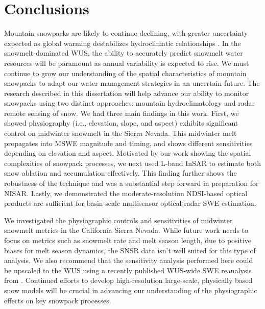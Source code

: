 
\hypertarget{ch5}{\chapter{Conclusions}\label{ch5}}

Mountain snowpacks are likely to continue declining, with greater uncertainty expected as global warming destabilizes hydroclimatic relationships \citep{millyStationarityDeadWhither2008}. In the snowmelt-dominated WUS, the ability to accurately predict snowmelt water resources will be paramount as annual variability is expected to rise. We must continue to grow our understanding of the spatial characteristics of mountain snowpacks to adapt our water management strategies in an uncertain future. The research described in this dissertation will help advance our ability to monitor snowpacks using two distinct approaches: mountain hydroclimatology and radar remote sensing of snow. We had three main findings in this work. First, we showed physiography (i.e., elevation, slope, and aspect) exhibits significant control on midwinter snowmelt in the Sierra Nevada. This midwinter melt propagates into MSWE magnitude and timing, and shows different sensitivities depending on elevation and aspect. Motivated by our work showing the spatial complexities of snowpack processes, we next used L-band InSAR to estimate both snow ablation and accumulation effectively. This finding further shows the robustness of the technique and was a substantial step forward in preparation for NISAR. Lastly, we demonstrated the moderate-resolution NDSI-based optical products are sufficient for basin-scale multisensor optical-radar SWE estimation. 

We investigated the physiographic controls and sensitivities of midwinter snowmelt metrics in the California Sierra Nevada. While future work needs to focus on metrics such as snowmelt rate and melt season length, due to positive biases for melt season dynamics, the SNSR data isn't well suited for this type of analysis. We also recommend that the sensitivity analysis performed here could be upscaled to the WUS using a recently published WUS-wide SWE reanalysis from \cite{fangWesternUnitedStates2022}. Continued efforts to develop high-resolution large-scale, physically based snow models will be crucial in advancing our understanding of the physiographic effects on key snowpack processes.

